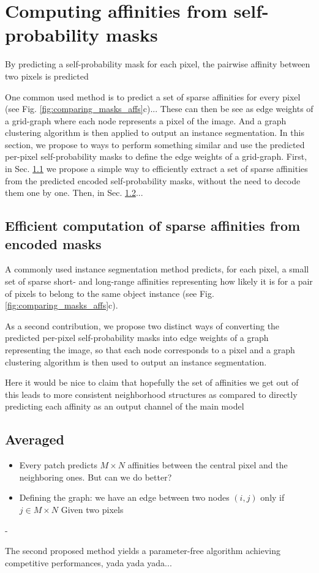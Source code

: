 \section{Computing affinities from self-probability masks}
By predicting a self-probability mask for each pixel, the pairwise affinity between two pixels is predicted 


One common used method is to predict a set of sparse affinities for every pixel (see Fig. \ref{fig:comparing_masks_affs}c)... 
These can then be see as edge weights of a grid-graph where each node represents a pixel of the image. And a graph clustering algorithm is then applied to output an instance segmentation.
In this section, we propose to ways to perform something similar and use the predicted per-pixel self-probability masks to define the edge weights of a grid-graph.
First, in Sec. \ref{sec:efficient_affs} we propose a simple way to efficiently extract a set of sparse affinities from the predicted encoded self-probability masks, without the need to decode them one by one. Then, in Sec. \ref{sec:prob_affs}...

\subsection{Efficient computation of sparse affinities from encoded masks}\label{sec:efficient_affs}
A commonly used instance segmentation method predicts, for each pixel, a small set of sparse short- and long-range affinities representing how likely it is for a pair of pixels to belong to the same object instance (see Fig. \ref{fig:comparing_masks_affs}c).



As a second contribution, we propose two distinct ways of converting the predicted per-pixel self-probability masks into edge weights of a graph representing the image, so that each node corresponds to a pixel and a graph clustering algorithm is then used to output an instance segmentation.

Here it would be nice to claim that hopefully the set of affinities we get out of this leads to more consistent neighborhood structures as compared to directly predicting each affinity as an output channel of the main model

\subsection{Averaged }\label{sec:prob_affs}
\begin{itemize}
\item Every patch predicts $M\times N$ affinities between the central pixel and the neighboring ones. But can we do better?
\item Defining the graph: we have an edge between two nodes $(i, j)$ only if $j \in M\times N$ Given two pixels  
\end{itemize}
- 


The second proposed method yields a parameter-free algorithm achieving competitive performances, yada yada yada... 



